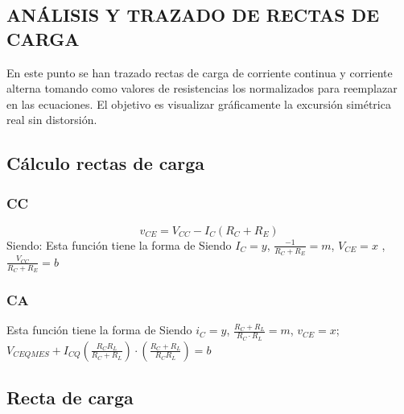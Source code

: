 \begin{multicols}{2}
\section{ANÁLISIS Y TRAZADO DE RECTAS DE CARGA}
        \sangria{} En este punto se han trazado rectas de carga de corriente continua y corriente alterna tomando como valores de resistencias los normalizados para reemplazar en las ecuaciones. El objetivo es visualizar gráficamente la excursión simétrica real sin distorsión.

        \subsection{Cálculo rectas de carga}
        \subsubsection{CC}
        \[
        v_{CE} = V_{CC} - I_C (R_C + R_E)
        \]
        Siendo:
        Esta función tiene la forma de
        	Siendo $I_C=y$, $\frac{-1}{R_C+R_E}=m$, $V_{CE}=x$ , $\frac{V_{CC}}{R_C + R_E}=b$


        \subsubsection{CA}
        Esta función tiene la forma de
        	Siendo $i_C=y$, $\frac{R_C + R_L}{R_C \cdot R_L}=m$, $v_{CE}=x$; $V_{CEQMES} + I_{CQ}(\frac{R_CR_L}{R_C + R_L}) \cdot (\frac{R_C + R_L}{R_CR_L})=b$
\end{multicols}

\subsection{Recta de carga}

